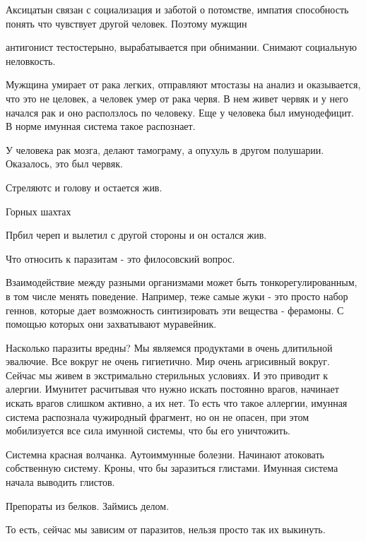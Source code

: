 Аксицатын связан с социализация и 
заботой о потомстве,
импатия способность понять что чувствует
другой человек.
Поэтому мужщин

антигонист тестостерыно,
вырабатывается при обнимании.
Снимают социальную неловкость.

Мужщина умирает от рака легких,
отправляют мтостазы на анализ и
оказывается, что это не целовек,
а человек умер от рака червя. В нем
живет червяк и у него начался рак и оно
расползлось по человеку. Еще
у человека был имунодефицит.
В норме имунная система такое распознает.

У человека рак мозга,
делают тамограму, а опухуль в
другом полушарии. Оказалось,
это был червяк.

Стреляютс и голову и остается жив. 

Горных шахтах

Прбил череп и вылетил с другой стороны и
он остался жив.

Что относить к паразитам - это
филосовский вопрос.

Взаимодействие между разными организмами
может быть тонкорегулированным,
в том числе менять поведение. Например,
теже самые жуки - это
просто набор геннов, которые дает возможность
синтизировать эти вещества - ферамоны. С помощью
которых они захватывают муравейник.


Насколько паразиты вредны? Мы
являемся продуктами в очень длитильной эвалючие.
Все вокруг не очень гигиетично. Мир очень агрисивный вокруг.
Сейчас мы живем в экстримально стерильных условиях.
И это приводит к алергии. Имунитет расчитывая
что нужно искать постоянно врагов,
начинает искать врагов слишком активно,
а их нет. То есть что такое аллергии,
имунная система распознала чужиродный фрагмент, но он
не опасен, при этом мобилизуется все сила имунной системы, что
бы его уничтожить.

Системна красная волчанка. Аутоиммунные болезни. Начинают
атоковать собственную систему. Кроны, что бы
заразиться глистами. Имунная система начала выводить
глистов.

Препораты из белков. Займись делом.

То есть, сейчас мы зависим от паразитов, нельзя
просто так их выкинуть.